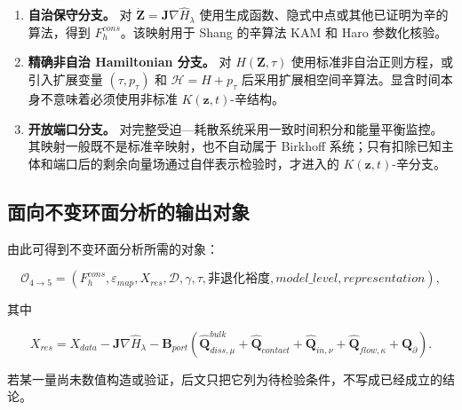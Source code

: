 \begin{enumerate}
\def\labelenumi{\arabic{enumi}.}
\tightlist
\item
  \textbf{自治保守分支。} 对 \(\dot{\mathbf{Z}} = \mathbf{J}\nabla{\widehat{H}}_{\lambda}\) 使用生成函数、隐式中点或其他已证明为辛的算法，得到 \(F_{h}^{cons}\)。该映射用于 Shang 的辛算法 KAM 和 Haro 参数化核验。
\item
  \textbf{精确非自治 Hamiltonian 分支。} 对 \(H\left( \mathbf{Z},\tau \right)\) 使用标准非自治正则方程，或引入扩展变量 \(\left( \tau,p_{\tau} \right)\) 和 \(\mathcal{H} = H + p_{\tau}\) 后采用扩展相空间辛算法。显含时间本身不意味着必须使用非标准 \(K\left( \mathbf{z},t \right)\)-辛结构。
\item
  \textbf{开放端口分支。} 对完整受迫---耗散系统采用一致时间积分和能量平衡监控。其映射一般既不是标准辛映射，也不自动属于 Birkhoff 系统；只有扣除已知主体和端口后的剩余向量场通过自伴表示检验时，才进入的 \(K\left( \mathbf{z},t \right)\)-辛分支。
\end{enumerate}

\subsection{面向不变环面分析的输出对象}\label{sec:chnn-4-8}

由此可得到不变环面分析所需的对象：

\begin{equation}
\label{eq:chnn-4-62}
\mathcal{O}_{4 \rightarrow 5} = \left( F_{h}^{cons},\varepsilon_{map},X_{res},\mathcal{D},\gamma,\tau,\text{非退化裕度},model\_ level,representation \right),
\end{equation}

其中

\begin{equation}
\label{eq:chnn-4-63}
\boxed{X_{res} = X_{data} - \mathbf{J}\nabla{\widehat{H}}_{\lambda} - \mathbf{B}_{port}\left( {\widehat{\mathbf{Q}}}_{diss,\mu}^{bulk} + {\widehat{\mathbf{Q}}}_{contact} + {\widehat{\mathbf{Q}}}_{in,\nu} + {\widehat{\mathbf{Q}}}_{flow,\kappa} + \mathbf{Q}_{\partial} \right).}
\end{equation}

若某一量尚未数值构造或验证，后文只把它列为待检验条件，不写成已经成立的结论。
